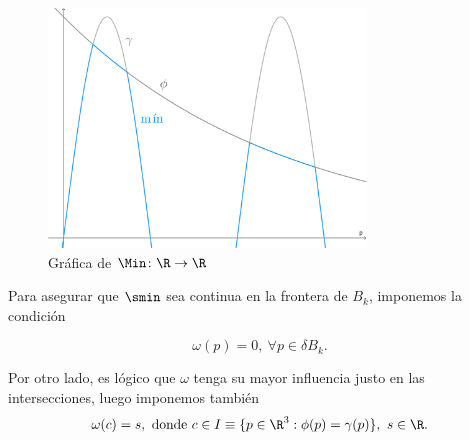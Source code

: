 \begin{figure}[t]
    \centering
    \includegraphics[width=0.75\textwidth]{Plantilla-TFG-master/img/smooth_real.png}
    \caption{Gráfica de $\Min\colon \R\to\R$}
    \label{fig:min_real}
\end{figure}

Para asegurar que $\smin$ sea continua en la frontera de $B_{k}$, imponemos la condición 

\begin{equation*}
    \omega(p) = 0,\ \forall p \in \delta B_{k}.
\end{equation*}

Por otro lado, es lógico que $\omega$ tenga su mayor influencia justo en las intersecciones, luego imponemos también 
\begin{equation*}
    \omega(c) = s, \text{ donde } c \in I \equiv \{p\in\R^3 : \phi(p) = \gamma(p)\},\ s\in \R.
\end{equation*}

